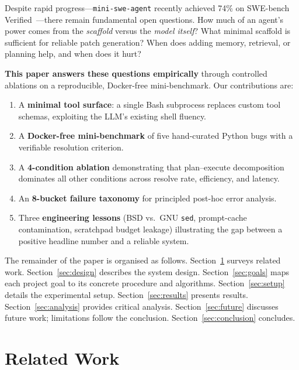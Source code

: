 \documentclass[11pt]{article}
\begin{document}
Despite rapid progress---\texttt{mini-swe-agent} recently achieved 74\% on
SWE-bench Verified~\citep{yang2024sweagent}---there remain fundamental open
questions.  How much of an agent's power comes from the \emph{scaffold}
versus the \emph{model itself}?  What minimal scaffold is sufficient for
reliable patch generation?  When does adding memory, retrieval, or
planning help, and when does it hurt?

\textbf{This paper answers these questions empirically} through controlled
ablations on a reproducible, Docker-free mini-benchmark.  Our contributions
are:

\begin{enumerate}[leftmargin=*, label=\textbf{C\arabic*.}]
  \item A \textbf{minimal tool surface}: a single Bash subprocess replaces
        custom tool schemas, exploiting the LLM's existing shell fluency.
  \item A \textbf{Docker-free mini-benchmark} of five hand-curated Python
        bugs with a verifiable resolution criterion.
  \item A \textbf{4-condition ablation} demonstrating that plan--execute
        decomposition dominates all other conditions across resolve rate,
        efficiency, and latency.
  \item An \textbf{8-bucket failure taxonomy} for principled post-hoc
        error analysis.
  \item Three \textbf{engineering lessons} (BSD vs.\ GNU \texttt{sed},
        prompt-cache contamination, scratchpad budget leakage) illustrating
        the gap between a positive headline number and a reliable system.
\end{enumerate}

The remainder of the paper is organised as follows.
Section~\ref{sec:related} surveys related work.
Section~\ref{sec:design} describes the system design.
Section~\ref{sec:goals} maps each project goal to its concrete procedure and algorithms.
Section~\ref{sec:setup} details the experimental setup.
Section~\ref{sec:results} presents results.
Section~\ref{sec:analysis} provides critical analysis.
Section~\ref{sec:future} discusses future work; limitations follow the conclusion.
Section~\ref{sec:conclusion} concludes.

\section{Related Work}
\label{sec:related}
\end{document}
